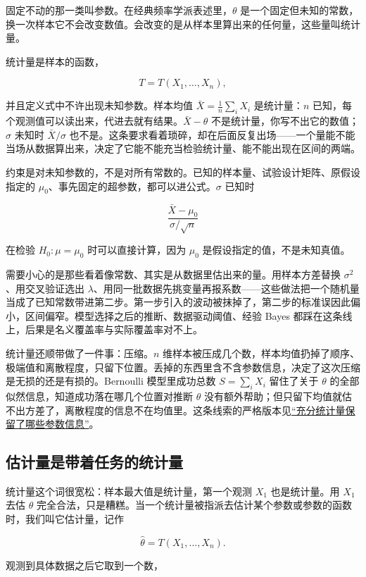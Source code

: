 固定不动的那一类叫参数。在经典频率学派表述里，\(\theta\) 是一个固定但未知的常数，换一次样本它不会改变数值。会改变的是从样本里算出来的任何量，这些量叫统计量。

统计量是样本的函数，

\[
T=T(X_1,\ldots,X_n),
\]

并且定义式中不许出现未知参数。样本均值 \(\bar X=\frac1n\sum_i X_i\) 是统计量：\(n\) 已知，每个观测值可以读出来，代进去就有结果。\(\bar X-\theta\) 不是统计量，你写不出它的数值；\(\sigma\) 未知时 \(\bar X/\sigma\) 也不是。这条要求看着琐碎，却在后面反复出场——一个量能不能当场从数据算出来，决定了它能不能充当检验统计量、能不能出现在区间的两端。

约束是对未知参数的，不是对所有常数的。已知的样本量、试验设计矩阵、原假设指定的 \(\mu_0\)、事先固定的超参数，都可以进公式。\(\sigma\) 已知时

\[
\frac{\bar X-\mu_0}{\sigma/\sqrt n}
\]

在检验 \(H_0:\mu=\mu_0\) 时可以直接计算，因为 \(\mu_0\) 是假设指定的值，不是未知真值。

需要小心的是那些看着像常数、其实是从数据里估出来的量。用样本方差替换 \(\sigma^2\)、用交叉验证选出 \(\lambda\)、用同一批数据先挑变量再报系数——这些做法把一个随机量当成了已知常数带进第二步。第一步引入的波动被抹掉了，第二步的标准误因此偏小，区间偏窄。模型选择之后的推断、数据驱动阈值、经验 Bayes 都踩在这条线上，后果是名义覆盖率与实际覆盖率对不上。

统计量还顺带做了一件事：压缩。\(n\) 维样本被压成几个数，样本均值扔掉了顺序、极端值和离散程度，只留下位置。丢掉的东西里含不含参数信息，决定了这次压缩是无损的还是有损的。Bernoulli 模型里成功总数 \(S=\sum_i X_i\) 留住了关于 \(\theta\) 的全部似然信息，知道成功落在哪几个位置对推断 \(\theta\) 没有额外帮助；但只留下均值就估不出方差了，离散程度的信息不在均值里。这条线索的严格版本见\hyperref[sec:11-Mathematical-Statistics/03-Sufficient-Statistics-and-Information/01]{``充分统计量保留了哪些参数信息''}。

\subsection{估计量是带着任务的统计量}

统计量这个词很宽松：样本最大值是统计量，第一个观测 \(X_1\) 也是统计量。用 \(X_1\) 去估 \(\theta\) 完全合法，只是糟糕。当一个统计量被指派去估计某个参数或参数的函数时，我们叫它估计量，记作

\[
\hat\theta=T(X_1,\ldots,X_n).
\]

观测到具体数据之后它取到一个数，

